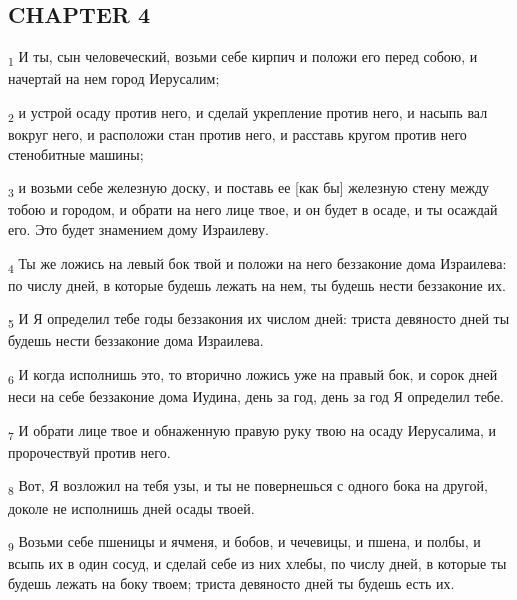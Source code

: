 \subsection{CHAPTER 4}
\begin{tcolorbox}
\textsubscript{1} И ты, сын человеческий, возьми себе кирпич и положи его перед собою, и начертай на нем город Иерусалим;
\end{tcolorbox}
\begin{tcolorbox}
\textsubscript{2} и устрой осаду против него, и сделай укрепление против него, и насыпь вал вокруг него, и расположи стан против него, и расставь кругом против него стенобитные машины;
\end{tcolorbox}
\begin{tcolorbox}
\textsubscript{3} и возьми себе железную доску, и поставь ее [как бы] железную стену между тобою и городом, и обрати на него лице твое, и он будет в осаде, и ты осаждай его. Это будет знамением дому Израилеву.
\end{tcolorbox}
\begin{tcolorbox}
\textsubscript{4} Ты же ложись на левый бок твой и положи на него беззаконие дома Израилева: по числу дней, в которые будешь лежать на нем, ты будешь нести беззаконие их.
\end{tcolorbox}
\begin{tcolorbox}
\textsubscript{5} И Я определил тебе годы беззакония их числом дней: триста девяносто дней ты будешь нести беззаконие дома Израилева.
\end{tcolorbox}
\begin{tcolorbox}
\textsubscript{6} И когда исполнишь это, то вторично ложись уже на правый бок, и сорок дней неси на себе беззаконие дома Иудина, день за год, день за год Я определил тебе.
\end{tcolorbox}
\begin{tcolorbox}
\textsubscript{7} И обрати лице твое и обнаженную правую руку твою на осаду Иерусалима, и пророчествуй против него.
\end{tcolorbox}
\begin{tcolorbox}
\textsubscript{8} Вот, Я возложил на тебя узы, и ты не повернешься с одного бока на другой, доколе не исполнишь дней осады твоей.
\end{tcolorbox}
\begin{tcolorbox}
\textsubscript{9} Возьми себе пшеницы и ячменя, и бобов, и чечевицы, и пшена, и полбы, и всыпь их в один сосуд, и сделай себе из них хлебы, по числу дней, в которые ты будешь лежать на боку твоем; триста девяносто дней ты будешь есть их.
\end{tcolorbox}
